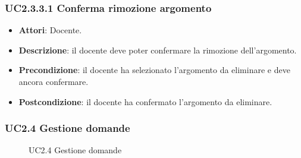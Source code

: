 \subsubsection{UC2.3.3.1 Conferma rimozione argomento}
\begin{itemize}
\item \textbf{Attori}: Docente.
\item \textbf{Descrizione}: il docente deve poter confermare la rimozione dell'argomento.
\item \textbf{Precondizione}: il docente ha selezionato l'argomento da eliminare e deve ancora confermare.
\item \textbf{Postcondizione}: il docente ha confermato l'argomento da eliminare.
\end{itemize}
\subsubsection{UC2.4 Gestione domande}
\begin{figure}[H]
\centering
\noindent{}
\caption{UC2.4 Gestione domande}
\end{figure}
